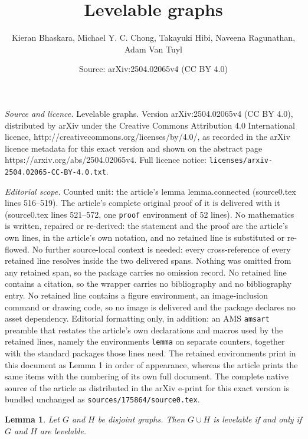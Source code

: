 \documentclass[10pt,a4paper]{amsart}
\title{Levelable graphs}
\author{Kieran Bhaskara, Michael Y. C. Chong, Takayuki Hibi, Naveena Ragunathan, Adam Van Tuyl}
\date{Source: arXiv:2504.02065v4 (CC BY 4.0)}
\newtheorem{lemma}{Lemma}
\begin{document}
\maketitle

\noindent\emph{Source and licence.} Levelable graphs. Version arXiv:2504.02065v4 (CC BY 4.0), distributed by arXiv under the Creative Commons Attribution 4.0 International licence, http://creativecommons.org/licenses/by/4.0/, as recorded in the arXiv licence metadata for this exact version and shown on the abstract page https://arxiv.org/abs/2504.02065v4. Full licence notice: \texttt{licenses/arxiv-2504.02065-CC-BY-4.0.txt}.\par\smallskip

\noindent\textit{Editorial scope.} Counted unit: the article's lemma lemma.connected (source0.tex lines 516--519). The article's complete original proof of it is delivered with it (source0.tex lines 521--572, one \texttt{proof} environment of 52 lines). No mathematics is written, repaired or re-derived: the statement and the proof are the article's own lines, in the article's own notation, and no retained line is substituted or re-flowed.  No further source-local context is needed: every cross-reference of every retained line resolves inside the two delivered spans.  Nothing was omitted from any retained span, so the package carries no omission record.  No retained line contains a citation, so the wrapper carries no bibliography and no bibliography entry.  No retained line contains a figure environment, an image-inclusion command or drawing code, so no image is delivered and the package declares no asset dependency.  Editorial formatting only, in addition: an AMS \texttt{amsart} preamble that restates the article's own declarations and macros used by the retained lines, namely the environments \texttt{lemma} on separate counters, together with the standard packages those lines need.  The retained environments print in this document as Lemma 1 in order of appearance, whereas the article prints the same items with the numbering of its own full document.  The complete native source of the article as distributed in the arXiv e-print for this exact version is bundled unchanged as \texttt{sources/175864/source0.tex}.
\begin{lemma}\label{lemma.connected}
Let $G$ and $H$ be disjoint graphs.  Then $G \cup H$ is levelable if
and only if $G$ and $H$ are levelable.
\end{lemma}
\end{document}
